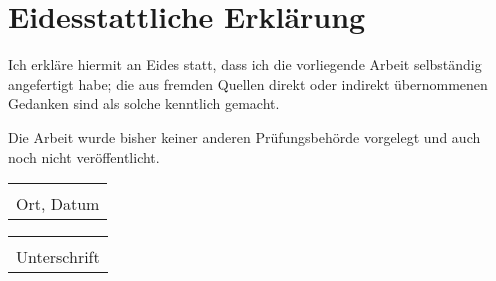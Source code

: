 \chapter*{\centering Eidesstattliche Erklärung}
\newcommand{\titledate}[2][2.5in]{%
  \noindent%
  \begin{tabular}{@{}p{#1}@{}}
    \\ \hline \\[-.75\normalbaselineskip]
    #2
  \end{tabular} \hspace{1in}
  \begin{tabular}{@{}p{#1}@{}}
    \\ \hline \\[-.75\normalbaselineskip]
    Unterschrift
  \end{tabular}
}
Ich erkläre hiermit an Eides statt, dass ich die vorliegende Arbeit selbständig angefertigt habe; 
die  aus  fremden  Quellen  direkt  oder  indirekt  übernommenen  Gedanken  sind  als  solche 
kenntlich gemacht. 
 

Die  Arbeit  wurde  bisher  keiner  anderen  Prüfungsbehörde  vorgelegt  und  auch  noch  nicht 
veröffentlicht. 
\vfill
\titledate{Ort, Datum}